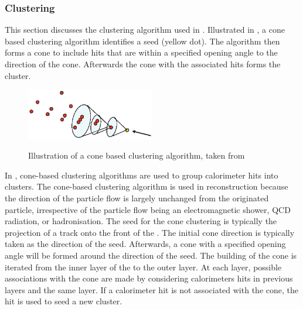 \subsubsection{Clustering}
\label{sec:pandoraConeCluster}

This section discusses the clustering algorithm used in \pandora. Illustrated in , a cone based clustering algorithm identifies a seed (yellow dot). The algorithm then forms a cone to include hits that are within a specified opening angle to the direction of the cone. Afterwards the cone with the associated hits forms the cluster.






\begin{figure}[tbph]
\centering
{\includegraphics[width=0.5\textwidth]{pandora/coneClustering}}%
\caption{Illustration of a cone based clustering algorithm, taken from \cite{Marshall:pandoraLC}}
\label{fig:pandoraConeClustering}
\end{figure}


In \pandora, cone-based clustering algorithms are used to group calorimeter hits into clusters. The cone-based clustering algorithm is used in \pandora reconstruction because the direction of the particle flow is largely unchanged from the originated particle, irrespective of  the particle flow being an electromagnetic shower, QCD radiation, or hadronisation. The seed for the cone clustering is typically the projection of a track onto the front of the \ECAL.  The initial cone direction is typically taken as the direction of the seed. Afterwards, a cone with a specified opening angle will be formed around the direction of the seed. The building of the cone is iterated from the inner layer of the \ECAL to the outer layer. At each layer, possible associations  with the cone are made by considering calorimeters hits in previous layers and the same layer. If a calorimeter hit is not associated with the cone, the hit is used to seed a new cluster.

